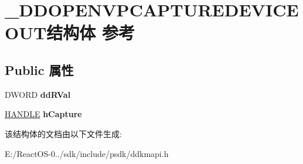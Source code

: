 \hypertarget{struct___d_d_o_p_e_n_v_p_c_a_p_t_u_r_e_d_e_v_i_c_e_o_u_t}{}\section{\+\_\+\+D\+D\+O\+P\+E\+N\+V\+P\+C\+A\+P\+T\+U\+R\+E\+D\+E\+V\+I\+C\+E\+O\+U\+T结构体 参考}
\label{struct___d_d_o_p_e_n_v_p_c_a_p_t_u_r_e_d_e_v_i_c_e_o_u_t}
\subsection*{Public 属性}
\begin{DoxyCompactItemize}
\item 
\mbox{\label{struct___d_d_o_p_e_n_v_p_c_a_p_t_u_r_e_d_e_v_i_c_e_o_u_t_aa9d893df388c4266e6617a8496aa9ae4}} 
D\+W\+O\+RD {\bfseries dd\+R\+Val}
\item 
\mbox{\label{struct___d_d_o_p_e_n_v_p_c_a_p_t_u_r_e_d_e_v_i_c_e_o_u_t_abad1489950922b59afc91a5e5b453609}} 
\hyperlink{interfacevoid}{H\+A\+N\+D\+LE} {\bfseries h\+Capture}
\end{DoxyCompactItemize}


该结构体的文档由以下文件生成\+:\begin{DoxyCompactItemize}
\item 
E\+:/\+React\+O\+S-\/0../sdk/include/psdk/ddkmapi.\+h\end{DoxyCompactItemize}
